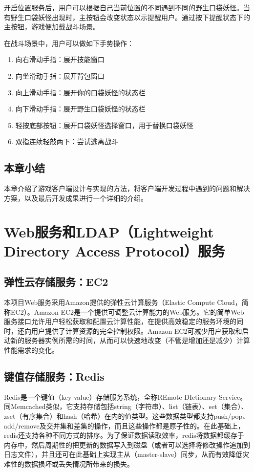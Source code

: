 \documentclass{article}
\begin{document}
\begin{CJK}{UTF8}{gbsn}
  开启位置服务后，用户可以根据自己当前位置的不同遇到不同的野生口袋妖怪。当有野生口袋妖怪出现时，主按钮会改变状态以示提醒用户。通过按下提醒状态下的主按钮，游戏便加载战斗场景。

  在战斗场景中，用户可以做如下手势操作：

  \begin{enumerate}
    \item 向右滑动手指：展开技能窗口
    \item 向坐滑动手指：展开背包窗口
    \item 向上滑动手指：展开你的口袋妖怪的状态栏
    \item 向下滑动手指：展开野生口袋妖怪的状态栏
    \item 轻按底部按钮：展开口袋妖怪选择窗口，用于替换口袋妖怪
    \item 双指连续轻敲两下：尝试逃离战斗
  \end{enumerate}

	\subsection{本章小结}
  本章介绍了游戏客户端设计与实现的方法，将客户端开发过程中遇到的问题和解决方案，以及最后开发成果进行一个详细的介绍。
  

	\section{Web服务和LDAP（Lightweight Directory Access Protocol）服务}
	\subsection{弹性云存储服务：EC2}
  本项目Web服务采用Amazon提供的弹性云计算服务（Elastic Compute Cloud，简称EC2）。Amazon EC2是一个提供可调整云计算能力的Web服务。它的简单Web服务接口允许用户轻松获取和配置云计算性能，在提供高效稳定的服务环境的同时，还向用户提供了计算资源的完全控制权限。Amazon EC2可减少用户获取和启动新的服务器实例所需的时间，从而可以快速地改变（不管是增加还是减少）计算性能需求的变化。\cite{AWS}

	\subsection{键值存储服务：Redis}
  Redis是一个键值（key-value）存储服务系统，全称REmote DIctionary Service。同Memcached类似，它支持存储包括string（字符串）、list（链表）、set（集合）、zset（有序集合）和hash（哈希）在内的值类型。这些数据类型都支持push/pop、add/remove及交并集和差集的操作，而且这些操作都是原子性的。在此基础上，redis还支持各种不同方式的排序。为了保证数据读取效率，redis将数据都缓存于内存中，然后周期性的把更新的数据写入到磁盘（或者可以选择将修改操作追加到日志文件），并且还可在此基础上实现主从（master-slave）同步，从而有效降低灾难性的数据损坏或丢失情况所带来的损失。


\end{CJK}
\end{document}
